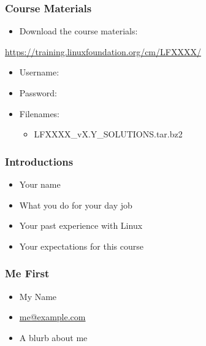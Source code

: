 \documentclass[bigger]{beamer}
\makeatletter
\newcommand{\mycourse}{LFXXXX}
\newcommand{\myversion}{vX.Y}
\newcommand{\myclasstz}{CST}
\newcommand{\myname}{My Name}
\newcommand{\myemail}{me@example.com}
\newcommand{\myblurb}{A blurb about me}
\newcommand{\solutions}{\item \mycourse\_\myversion\_SOLUTIONS.tar.bz2}
\newcommand{\resources}{}
\newcommand{\lfuser}{}
\newcommand{\lfpass}{}
\newif\ifVIRTUAL{}
\makeatother
\begin{document}
\begin{frame}
	\frametitle{Course Materials}
	\LARGE
	\begin{itemize} 
		\item Download the course materials:
	\end{itemize} 
	\vspace{-0.5em}
	{\normalsize\url{https://training.linuxfoundation.org/cm/\mycourse/}}
	\vspace{0.5em}
	\begin{itemize} 
		\item Username: \textbf{\lfuser}
		\item Password: \textbf{\lfpass}
		\vspace{0.5em}
		\item Filenames:
		\begin{itemize} 
			\large
			\solutions{}
			\resources{}
		\end{itemize} 
	\end{itemize}
\end{frame}

\begin{frame}
	\frametitle{Introductions}
	\LARGE
	\begin{itemize} 
		\item Your name
		\item What you do for your day job
		\item Your past experience with Linux
		\item Your expectations for this course
		\ifVIRTUAL{}
			\item Your Linux Distribution
			\item (Your Time Zone, \normalsize if not \myclasstz \LARGE )
		\fi %
	\end{itemize} 
\end{frame}

\begin{frame}
	\frametitle{Me First}
	\LARGE
	\begin{itemize} 
		\item \myname{}
		\item \url{\myemail}
		\item \myblurb{}
	\end{itemize} 
\end{frame}
\end{document}
